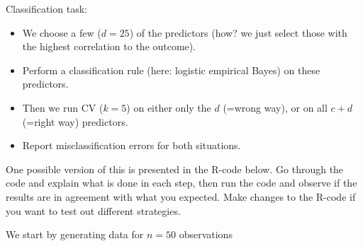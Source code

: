\documentclass[]{article}
\newenvironment{Shaded}{\begin{snugshade}}{\end{snugshade}}
\newcommand{\CommentTok}[1]{\textcolor[rgb]{0.56,0.35,0.01}{\textit{#1}}}
\newcommand{\DataTypeTok}[1]{\textcolor[rgb]{0.13,0.29,0.53}{#1}}
\newcommand{\DecValTok}[1]{\textcolor[rgb]{0.00,0.00,0.81}{#1}}
\newcommand{\KeywordTok}[1]{\textcolor[rgb]{0.13,0.29,0.53}{\textbf{#1}}}
\newcommand{\NormalTok}[1]{#1}
\newcommand{\OperatorTok}[1]{\textcolor[rgb]{0.81,0.36,0.00}{\textbf{#1}}}
\newcommand{\StringTok}[1]{\textcolor[rgb]{0.31,0.60,0.02}{#1}}
\providecommand{\tightlist}{%
  \setlength{\itemsep}{0pt}\setlength{\parskip}{0pt}}
\begin{document}
Classification task:

\begin{itemize}
\tightlist
\item
  We choose a few (\(d=25\)) of the predictors (how? we just select
  those with the highest correlation to the outcome).
\item
  Perform a classification rule (here: logistic empirical Bayes) on
  these predictors.
\item
  Then we run CV (\(k=5\)) on either only the \(d\) (=wrong way), or on
  all \(c+d\) (=right way) predictors.
\item
  Report misclassification errors for both situations.
\end{itemize}

One possible version of this is presented in the R-code below. Go
through the code and explain what is done in each step, then run the
code and observe if the results are in agreement with what you expected.
Make changes to the R-code if you want to test out different strategies.

We start by generating data for \(n=50\) observations

\begin{Shaded}
\end{Shaded}
\end{document}
